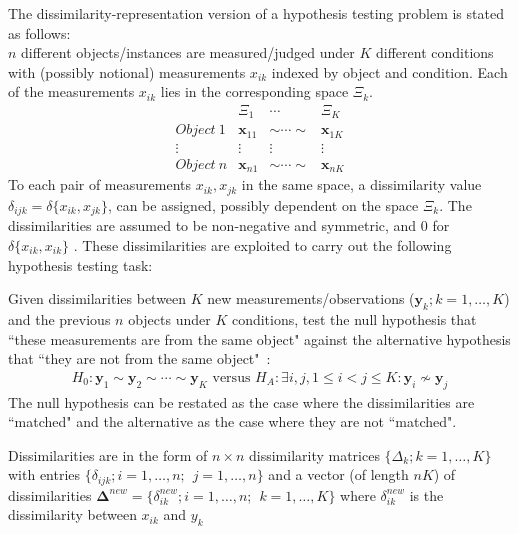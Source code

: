\documentclass[11pt]{article} %
\begin{document}
The dissimilarity-representation version of a hypothesis testing problem is stated as follows:\\
$n$ different objects/instances are measured/judged under $K$ different conditions with (possibly notional) measurements $x_{ik}$ indexed by object and condition. Each of the measurements $x_{ik}$ lies in  the corresponding space $\Xi_k$. 
\[  \begin{array}{cccc}
        & \Xi_1 & \cdots & \Xi_K\\
        Object ~ 1 & \bm{x}_{11} & \sim \cdots \sim & \bm{x}_{1K} \\
        \vdots & \vdots & \vdots & \vdots \\
        Object ~ n & \bm{x}_{n1} & \sim \cdots \sim & \bm{x}_{nK}
      \end{array}      
\]
To each pair of measurements $x_{ik},x_{jk}$ in the same space, a dissimilarity value $\delta_{ijk}=\delta\{x_{ik},x_{jk}\}$, can be assigned,  possibly dependent on the space $\Xi_k$. The dissimilarities are assumed to be non-negative and  symmetric, and 0 for $\delta\{x_{ik},x_{ik}\}$   . These  dissimilarities are exploited to carry out  the following hypothesis testing task:

 Given dissimilarities between  $K$ new measurements/observations ($\bm{y}_{k};k=1,\ldots,K$) and the previous 
$n$ objects under $K$ conditions,    test the null hypothesis  that ``these measurements are from the same  object"  against the alternative hypothesis that ``they are not  from the same  object"~\cite{JOFC}:
    \[
\begin{array}{l}
    H_0: \bm{y}_{1} \sim \bm{y}_{2} \sim \cdots \sim \bm{y}_{K}
 \text{ versus } 
 H_A: \exists i, j , 1\leq i < j \leq K :\bm{y}_{i} \nsim \bm{y}_{j}  
\end{array}
\]
 The null hypothesis can be restated as the case where the dissimilarities are ``matched" and the alternative as the case where they are not ``matched".

Dissimilarities are in the form  of $n \times n$  dissimilarity matrices $\{\Delta_k;k=1,\ldots,K\}$ with entries $\{\delta_{ijk} ;  i=1,\ldots,n;\hspace{5pt} j=1,\ldots,n\}$  and a  vector (of length $nK$) of dissimilarities  $\mathbf{\Delta}^{new}=\{ \delta_{ik}^{new}; i=1,\ldots, n;\hspace{5pt} k=1,\ldots,K\}  $  where $\delta_{ik}^{new} $ is the dissimilarity  between  $x_{ik}$ and $y_k$
\end{document}
